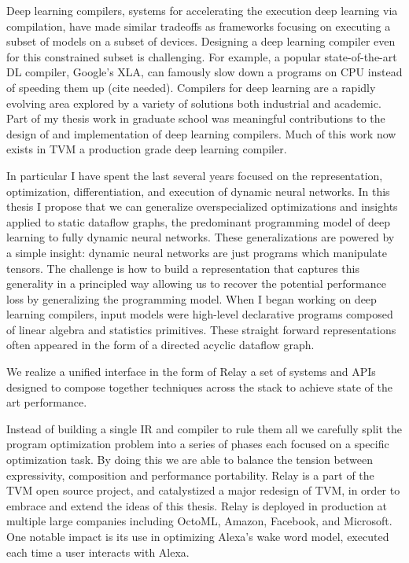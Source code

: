 Deep learning compilers, systems for accelerating the execution deep learning via compilation,
 have made similar tradeoffs as frameworks focusing on executing a subset of models on a subset of devices.
Designing a deep learning compiler even for this constrained subset is challenging.
For example,
  a popular state-of-the-art DL compiler,
  Google's XLA, can famously slow down a programs on
  CPU instead of speeding them up (cite needed).
Compilers for deep learning are a rapidly evolving area explored by a
  variety of solutions both industrial and academic.
Part of my thesis work in graduate school
  was meaningful contributions to the design of and implementation of deep learning compilers.
Much of this work now exists in TVM a production grade deep learning compiler.

In particular I have spent the last several years focused on the
  representation,
  optimization,
  differentiation,
  and execution of dynamic neural networks.
In this thesis I propose that we can generalize overspecialized optimizations
  and insights applied to static dataflow graphs, the predominant programming model
  of deep learning to fully dynamic neural networks.
These generalizations are powered by a simple insight:
  dynamic neural networks are just programs which manipulate tensors.
The challenge is how to build a representation that captures this generality
  in a principled way allowing us to recover the potential performance loss by generalizing
  the programming model.
When I began working on deep learning compilers, input models were high-level
  declarative programs composed of linear algebra and statistics primitives.
These straight forward representations often appeared in the form of
  a directed acyclic dataflow graph.

We realize a unified interface in the form of Relay a set of systems and APIs designed
  to compose together techniques across the stack to achieve state of the art performance.

Instead of building a single IR and compiler to rule them all we carefully split
  the program optimization problem into a series of phases each focused on a specific
  optimization task.
By doing this we are able to balance the tension between expressivity, composition
  and performance portability.
Relay is a part of the TVM open source project, and catalystized a major redesign of
  TVM, in order to embrace and extend the ideas of this thesis.
Relay is deployed in production at multiple large companies including
  OctoML, Amazon, Facebook, and Microsoft.
One notable impact is its use in
  optimizing Alexa’s wake word model, executed each time a user interacts with
  Alexa.

